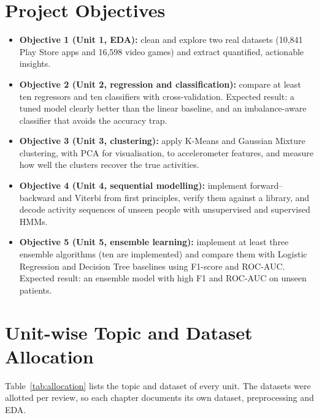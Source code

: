 \section{Project Objectives}
\begin{itemize}
\item \textbf{Objective 1 (Unit 1, EDA):} clean and explore two real datasets (10,841 Play Store apps and 16,598 video
games) and extract quantified, actionable insights.
\item \textbf{Objective 2 (Unit 2, regression and classification):} compare at least ten regressors and ten classifiers
with cross-validation. Expected result: a tuned model clearly better than the linear baseline, and an imbalance-aware
classifier that avoids the accuracy trap.
\item \textbf{Objective 3 (Unit 3, clustering):} apply K-Means and Gaussian Mixture clustering, with PCA for
visualisation, to accelerometer features, and measure how well the clusters recover the true activities.
\item \textbf{Objective 4 (Unit 4, sequential modelling):} implement forward–backward and Viterbi from first principles,
verify them against a library, and decode activity sequences of unseen people with unsupervised and supervised HMMs.
\item \textbf{Objective 5 (Unit 5, ensemble learning):} implement at least three ensemble algorithms (ten are
implemented) and compare them with Logistic Regression and Decision Tree baselines using F1-score and ROC-AUC. Expected
result: an ensemble model with high F1 and ROC-AUC on unseen patients.
\end{itemize}

\section{Unit-wise Topic and Dataset Allocation}
Table~\ref{tab:allocation} lists the topic and dataset of every unit. The datasets were allotted per review, so each
chapter documents its own dataset, preprocessing and EDA.

